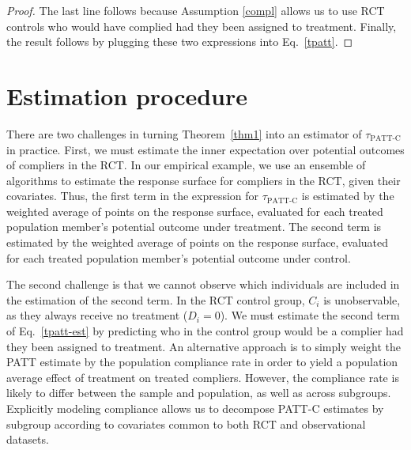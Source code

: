 \documentclass[hidelinks,12pt]{article}
\begin{document}
{\begin{proof}
{\color{red}The last line follows because Assumption \ref{compl} allows us to use RCT controls who would have complied had they been assigned to treatment}. Finally, the result follows by plugging these two expressions into Eq.~\eqref{tpatt}.
\end{proof}

\section{Estimation procedure}\label{estimation}
There are two challenges in turning Theorem~\ref{thm1} into an estimator of $\tau_{\text{PATT-C}}$ in practice. First, we must estimate the inner expectation over potential outcomes of compliers in the RCT. In our empirical example, we use an ensemble of algorithms \citep{van2007} to estimate the response surface for compliers in the RCT, given their covariates. Thus, the first term in the expression for $\tau_{\text{PATT-C}}$ is estimated by the weighted average of points on the response surface, evaluated for each treated population member's potential outcome under treatment. The second term is estimated by the weighted average of points on the response surface, evaluated for each treated population member's potential outcome under control.

The second challenge is that we cannot observe which individuals are included in the estimation of the second term. In the RCT control group, $C_i$ is unobservable, as they always receive no treatment ($D_i=0$). We must estimate the second term of Eq.~\eqref{tpatt-est} by predicting who in the control group would be a complier had they been assigned to treatment. {\color{red}An alternative approach is to simply weight the PATT estimate by the population compliance rate in order to yield a population average effect of treatment on treated compliers. However, the compliance rate is likely to differ between the sample and population, as well as across subgroups. Explicitly modeling compliance allows us to decompose PATT-C estimates by subgroup according to covariates common to both RCT and observational datasets.}

}
\end{document}
